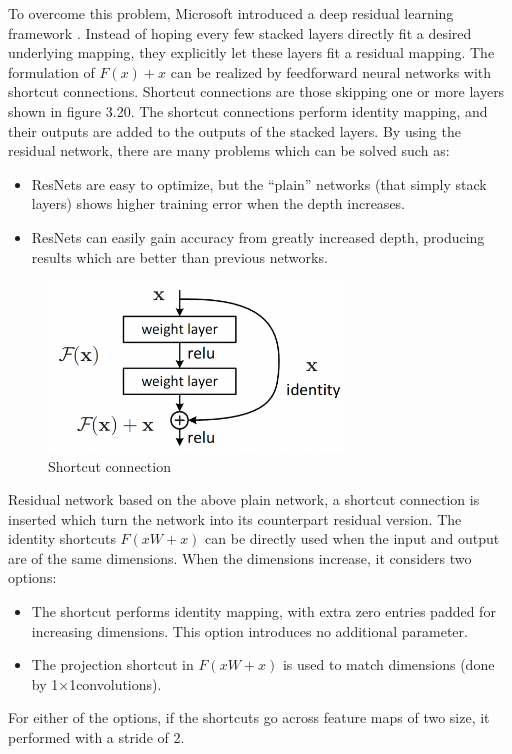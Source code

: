 To overcome this problem, Microsoft introduced a deep residual learning framework \cite{he2016deep}. Instead of hoping every few stacked layers directly fit a desired underlying mapping, they explicitly let these layers fit a residual mapping. The formulation of $F(x)+x$ can be realized by feedforward neural networks with shortcut connections. Shortcut connections are those skipping one or more layers shown in figure 3.20. The shortcut connections perform identity mapping, and their outputs are added to the outputs of the stacked layers. By using the residual network, there are many problems which can be solved such as:
\begin{itemize}
	\item ResNets are easy to optimize, but the “plain” networks (that simply stack layers) shows higher training error when the depth increases.
	\item ResNets can easily gain accuracy from greatly increased depth, producing results which are better than previous networks.
\end{itemize}

\begin{figure}[h]
	\includegraphics[width=0.7\textwidth]{Figures/Section3_Shortcut.png} 
	\centering
	\captionsetup{justification=centering}
	\caption{Shortcut connection}
	\label{fig:shortcut}
\end{figure}

Residual network \cite{he2016deep} based on the above plain network, a shortcut connection is inserted which turn the network into its counterpart residual version.  The identity shortcuts $F(x{W}+x)$ can be directly used when the input and output are of the same dimensions. When the dimensions increase, it considers two options:
\begin{itemize}
	\item The shortcut performs identity mapping, with extra zero entries padded for increasing dimensions. This option introduces no additional parameter.
	\item The projection shortcut in $F(x{W}+x)$ is used to match dimensions (done by 1×1convolutions).
\end{itemize}
For either of the options, if the shortcuts go across feature maps of two size, it performed with a stride of 2.

